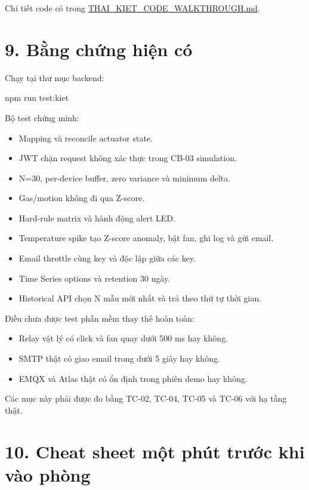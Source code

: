 \documentclass[11pt,oneside,openany]{book}
\renewcommand{\texttt}[1]{{\ttfamily\small #1}}
\newenvironment{Shaded}{\begin{snugshade}}{\end{snugshade}}
\newcommand{\NormalTok}[1]{\textcolor[rgb]{0.81,0.81,0.76}{#1}}
\newcommand{\OperatorTok}[1]{\textcolor[rgb]{0.81,0.81,0.76}{#1}}
\renewenvironment{Shaded}{%
  \def\FrameCommand{\fboxsep=8pt\colorbox{shadecolor}}%
  \MakeFramed{\advance\hsize-\width\FrameRestore}%
}{\endMakeFramed}
\providecommand{\tightlist}{\setlength{\itemsep}{1pt}\setlength{\parskip}{0pt}}
\begin{document}
Chi tiết code có trong \url{THAI_KIET_CODE_WALKTHROUGH.md}.

\section{9. Bằng chứng hiện
có}\label{9-bux1eb1ng-chux1ee9ng-hiux1ec7n-cuxf3}

Chạy tại thư mục \texttt{backend}:

\begin{Shaded}
\begin{Highlighting}[]
\NormalTok{npm run test}\OperatorTok{:}\NormalTok{kiet}
\end{Highlighting}
\end{Shaded}

Bộ test chứng minh:

\begin{itemize}
\tightlist
\item
  Mapping và reconcile actuator state.
\item
  JWT chặn request không xác thực trong CB-03 simulation.
\item
  N=30, per-device buffer, zero variance và minimum delta.
\item
  Gas/motion không đi qua Z-score.
\item
  Hard-rule matrix và hành động alert LED.
\item
  Temperature spike tạo Z-score anomaly, bật fan, ghi log và gửi email.
\item
  Email throttle cùng key và độc lập giữa các key.
\item
  Time Series options và retention 30 ngày.
\item
  Historical API chọn N mẫu mới nhất và trả theo thứ tự thời gian.
\end{itemize}

Điều chưa được test phần mềm thay thế hoàn toàn:

\begin{itemize}
\tightlist
\item
  Relay vật lý có click và fan quay dưới 500 ms hay không.
\item
  SMTP thật có giao email trong dưới 5 giây hay không.
\item
  EMQX và Atlas thật có ổn định trong phiên demo hay không.
\end{itemize}

Các mục này phải được đo bằng TC-02, TC-04, TC-05 và TC-06 với hạ tầng
thật.

\section{10. Cheat sheet một phút trước khi vào
phòng}\label{10-cheat-sheet-mux1ed9t-phuxfat-trux1b0ux1edbc-khi-vuxe0o-phuxf2ng}
\end{document}
